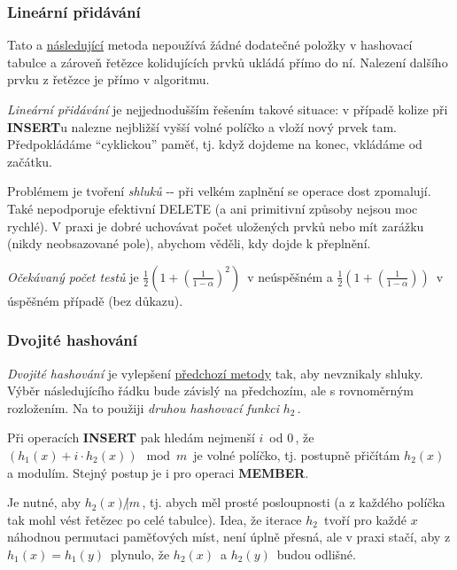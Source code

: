 \subsubsection{Lineární
přidávání}\label{lineuxe1rnuxed-pux159iduxe1vuxe1nuxed}

Tato a \protect\hyperlink{Dvojituxe9_hashovuxe1nuxed}{následující}
metoda nepoužívá žádné dodatečné položky v hashovací tabulce a zároveň
řetězce kolidujících prvků ukládá přímo do ní. Nalezení dalšího prvku z
řetězce je přímo v algoritmu.

\emph{Lineární přidávání} je nejjednodušším řešením takové situace: v
případě kolize při \textbf{INSERT}u nalezne nejbližší vyšší volné
políčko a vloží nový prvek tam. Předpokládáme ``cyklickou'' paměť, tj.
když dojdeme na konec, vkládáme od začátku.

Problémem je tvoření \emph{shluků} -\/- při velkém zaplnění se operace
dost zpomalují. Také nepodporuje efektivní DELETE (a ani primitivní
způsoby nejsou moc rychlé). V praxi je dobré uchovávat počet uložených
prvků nebo mít zarážku (nikdy neobsazované pole), abychom věděli, kdy
dojde k přeplnění.

\emph{Očekávaný počet testů} je
\(\frac{1}{2}\left(1+\left(\frac{1}{1-\alpha}\right)^2\right)\,\!\) v
neúspěšném a
\(\frac{1}{2}\left(1+\left(\frac{1}{1-\alpha}\right)\right)\,\!\) v
úspěšném případě (bez důkazu).

\subsubsection{Dvojité hashování}\label{dvojituxe9-hashovuxe1nuxed}

\emph{Dvojité hashování} je vylepšení
\protect\hyperlink{Lineuxe1rnuxed_pux159iduxe1vuxe1nuxed}{předchozí
metody} tak, aby nevznikaly shluky. Výběr následujícího řádku bude
závislý na předchozím, ale s rovnoměrným rozložením. Na to použiji
\emph{druhou hashovací funkci} \(h_2\,\!\).

Při operacích \textbf{INSERT} pak hledám nejmenší \(i\,\!\) od
\(0\,\!\), že \((h_1(x) + i\cdot h_2(x)) \mod m\,\!\) je volné políčko,
tj. postupně přičítám \(h_2(x)\,\!\) a modulím. Stejný postup je i pro
operaci \textbf{MEMBER}.

Je nutné, aby \(h_2(x) \not | m\,\!\), tj. abych měl prosté posloupnosti
(a z každého políčka tak mohl vést řetězec po celé tabulce). Idea, že
iterace \(h_2\,\!\) tvoří pro každé \(x\,\!\) náhodnou permutaci
paměťových míst, není úplně přesná, ale v praxi stačí, aby z
\(h_1(x) = h_1(y)\,\!\) plynulo, že \(h_2(x)\,\!\) a \(h_2(y)\,\!\)
budou odlišné.

